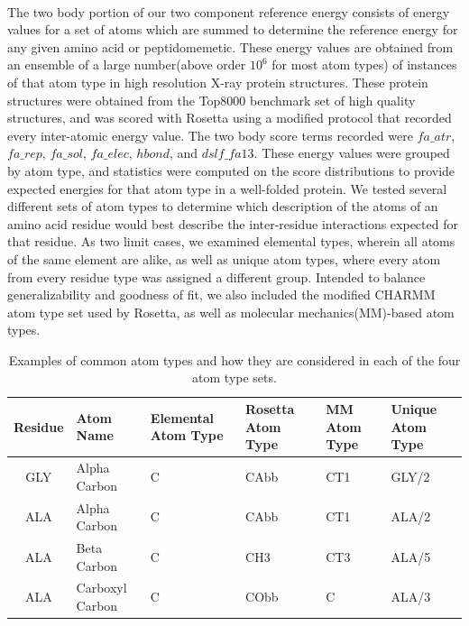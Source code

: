 \paragraph{}
The two body portion of our two component reference energy consists of energy values for a set of atoms which are summed to determine the reference energy for any given amino acid or peptidomemetic.
These energy values are obtained from an ensemble of a large number(above order $10^6$ for most atom types) of instances of that atom type in high resolution X-ray protein structures.
These protein structures were obtained from the Top8000 benchmark set of high quality structures\cite{lovell_structure_2003}, and was scored with Rosetta using a modified protocol that recorded every inter-atomic energy value.
The two body score terms recorded were $fa\_atr$, $fa\_rep$, $fa\_sol$, $fa\_elec$, $hbond$, and $dslf\_fa13$.
These energy values were grouped by atom type, and statistics were computed on the score distributions to provide expected energies for that atom type in a well-folded protein.
We tested several different sets of atom types to determine which description of the atoms of an amino acid residue would best describe the inter-residue interactions expected for that residue.
As two limit cases, we examined elemental types, wherein all atoms of the same element are alike, as well as unique atom types, where every atom from every residue type was assigned a different group.
Intended to balance generalizability and goodness of fit, we also included the modified CHARMM atom type set used by Rosetta\cite{leaver-fay_chapter_2011,bernard_charmm_1983}, as well as molecular mechanics(MM)-based atom types\cite{renfrew_incorporation_2012}.


\begin{table}[!htbp]

\fontsize{9pt}{9pt}
\selectfont

\begin{tabular}{c|lllll}
Residue & Atom Name & Elemental Atom Type & Rosetta Atom Type & MM Atom Type & Unique Atom Type\\
\hline
GLY & Alpha Carbon & C & CAbb & CT1 & GLY/2\\
ALA & Alpha Carbon & C & CAbb & CT1 & ALA/2\\
ALA & Beta Carbon & C & CH3 & CT3 & ALA/5\\
ALA & Carboxyl Carbon & C & CObb & C & ALA/3\\
\end{tabular}

\fontsize{10pt}{11pt}
\selectfont
\caption{Examples of common atom types and how they are considered in each of the four atom type sets.}
\label{tab:atypes_example}

\end{table}



